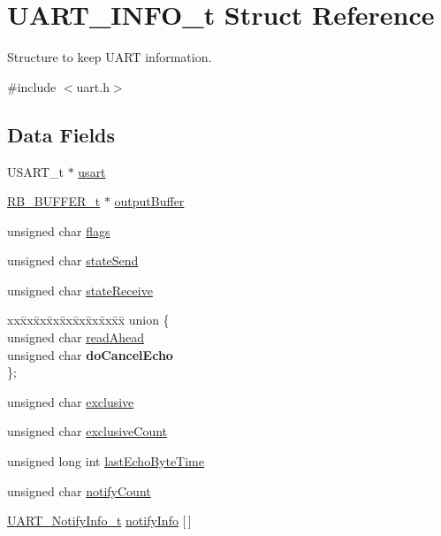 \hypertarget{struct_u_a_r_t___i_n_f_o__t}{}\section{U\+A\+R\+T\+\_\+\+I\+N\+F\+O\+\_\+t Struct Reference}
\label{struct_u_a_r_t___i_n_f_o__t}


Structure to keep U\+A\+RT information.  




{\ttfamily \#include $<$uart.\+h$>$}

\subsection*{Data Fields}
\begin{DoxyCompactItemize}
\item 
U\+S\+A\+R\+T\+\_\+t $\ast$ \hyperlink{struct_u_a_r_t___i_n_f_o__t_a5a819ee5e46999aaae5cb6813014ec08}{usart}
\item 
\hyperlink{struct_r_b___b_u_f_f_e_r__t}{R\+B\+\_\+\+B\+U\+F\+F\+E\+R\+\_\+t} $\ast$ \hyperlink{struct_u_a_r_t___i_n_f_o__t_aadf2552691eaf2d23f0d07e0cad646ff}{output\+Buffer}
\item 
unsigned char \hyperlink{struct_u_a_r_t___i_n_f_o__t_a78ac89a4a0f57ffa7c2ecf31749aa390}{flags}
\item 
unsigned char \hyperlink{struct_u_a_r_t___i_n_f_o__t_a41daacfc4d2f0d91bc315d3adc48947a}{state\+Send}
\item 
unsigned char \hyperlink{struct_u_a_r_t___i_n_f_o__t_a566746cda46477e331cb6795463b4b60}{state\+Receive}
\item 
\mbox{\label{struct_u_a_r_t___i_n_f_o__t_ad9d3ec3189e3093c0178aa7dc2f3376c}} 
\begin{tabbing}
xx\=xx\=xx\=xx\=xx\=xx\=xx\=xx\=xx\=\kill
union \{\\
\>unsigned char \hyperlink{struct_u_a_r_t___i_n_f_o__t_ad6027466dc4a46cc9f3880798b753658}{readAhead}\\
\>unsigned char {\bfseries doCancelEcho}\\
\}; \\

\end{tabbing}\item 
unsigned char \hyperlink{struct_u_a_r_t___i_n_f_o__t_a7d2133c9c461227274fff3898eeef8fe}{exclusive}
\item 
unsigned char \hyperlink{struct_u_a_r_t___i_n_f_o__t_af246eac5e612eff35894d6b1149941bc}{exclusive\+Count}
\item 
unsigned long int \hyperlink{struct_u_a_r_t___i_n_f_o__t_ad4270971ab5b6eb9c5582ff484c2ef7e}{last\+Echo\+Byte\+Time}
\item 
unsigned char \hyperlink{struct_u_a_r_t___i_n_f_o__t_a000a89447ba13237676e025f69a838ab}{notify\+Count}
\item 
\hyperlink{struct_u_a_r_t___notify_info__t}{U\+A\+R\+T\+\_\+\+Notify\+Info\+\_\+t} \hyperlink{struct_u_a_r_t___i_n_f_o__t_af41896ccaef0b7db8f67f01f8552b4bd}{notify\+Info} \mbox{[}$\,$\mbox{]}
\end{DoxyCompactItemize}


